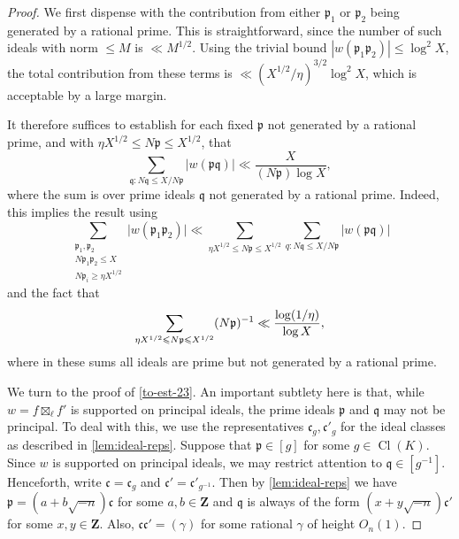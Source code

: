 \documentclass[11pt,reqno]{amsart}
\numberwithin{equation}{section}
\theoremstyle{definition}
\theoremstyle{remark}
\newcommand{\mf}{\mathfrak}
\renewcommand{\le}{\leqslant}
\renewcommand{\ge}{\geqslant}
\newcommand\Z{\mathbf{Z}}
\newcommand\classgroup{\operatorname{Cl}(K)}
\begin{document}
\begin{proof}
We first dispense with the contribution from either $\mf{p}_1$ or $\mf{p}_2$ being generated by a rational prime. This is straightforward, since the number of such ideals with norm $\le M$ is $\ll M^{1/2}$. Using the trivial bound $|w(\mf{p}_1 \mf{p}_2)| \le \log^2 X$, the total contribution from these terms is $\ll (X^{1/2}/\eta)^{3/2} \log^2 X$, which is acceptable by a large margin.

It therefore suffices to establish for each fixed $\mf{p}$ not generated by a rational prime, and with $\eta X^{1/2} \le N\mf{p} \le X^{1/2}$, that 
\begin{equation}\label{to-est-23}\sum_{\mf{q}: N\mf{q} \le X/N\mf{p}}|w(\mf{p}\mf{q})| \ll \frac{X}{(N\mf{p})\log X},\end{equation} where the sum is over prime ideals $\mf{q}$ not generated by a rational prime.
Indeed, this implies the result using 
\[
\sum_{\substack{\mf{p}_1,\mf{p}_2\\ N\mf{p}_1\mf{p}_2 \le X \\ N\mf{p}_i\ge \eta X^{1/2}}}  \big|w(\mf{p}_1\mf{p}_2)\big| \ll \sum_{\eta X^{1/2}\le N\mf{p}\le X^{1/2}}\sum_{q: N\mf{q} \le X/N\mf{p}}|w(\mf{p}\mf{q})|
\]
and the fact that
\[  \sum_{ \eta X^{1/2}\le N\mf{p} \le X^{1/2}}(N\mf{p})^{-1} \\
\ll \frac{\log (1/\eta)}{\log X} ,\] where in these sums all ideals are prime but not generated by a rational prime.

We turn to the proof of \cref{to-est-23}. An important subtlety here is that, while $w = f \boxtimes_{\ell} f'$ is supported on principal ideals, the prime ideals $\mf{p}$ and $\mf{q}$ may not be principal. To deal with this, we use the representatives $\mf{c}_g, \mf{c}'_g$ for the ideal classes as described in \cref{lem:ideal-reps}. Suppose that $\mf{p} \in [g]$ for some $g \in \classgroup$. Since $w$ is supported on principal ideals, we may restrict attention to $\mf{q} \in [g^{-1}]$. Henceforth, write $\mf{c} = \mf{c}_g$ and $\mf{c}' = \mf{c}'_{g^{-1}}$. Then by \cref{lem:ideal-reps} we have $\mf{p} = (a + b\sqrt{-n}) \mf{c}$ for some $a,b \in \Z$ and $\mf{q}$ is always of the form $(x + y \sqrt{-n}) \mf{c}'$ for some $x, y \in \Z$. Also, $\mf{c} \mf{c'} = (\gamma)$ for some rational $\gamma$ of height $O_n(1)$. 


\end{proof}
\end{document}
